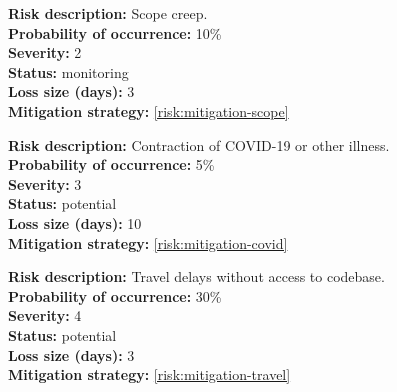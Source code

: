 \par

\hrulefill

\textbf{Risk description:} Scope creep.\\
\vspace{-2mm}
\textbf{Probability of occurrence:} 10\%\\
\vspace{-2mm}
\textbf{Severity:} 2\\
\vspace{-2mm}
\textbf{Status:} monitoring\\
\vspace{-2mm}
\textbf{Loss size (days):} 3\\
\textbf{Mitigation strategy:} \cref{risk:mitigation-scope}\\

\par

\pagebreak


\textbf{Risk description:} Contraction of COVID-19 or other illness.\\
\vspace{-2mm}
\textbf{Probability of occurrence:} 5\%\\
\vspace{-2mm}
\textbf{Severity:} 3\\
\vspace{-2mm}
\textbf{Status:} potential\\
\vspace{-2mm}
\textbf{Loss size (days):} 10\\
\vspace{-1mm}
\textbf{Mitigation strategy:} \cref{risk:mitigation-covid}\\


\hrulefill

\textbf{Risk description:} Travel delays without access to codebase.\\
\vspace{-2mm}
\textbf{Probability of occurrence:} 30\%\\
\vspace{-2mm}
\textbf{Severity:} 4\\
\vspace{-2mm}
\textbf{Status:} potential\\
\vspace{-2mm}
\textbf{Loss size (days):} 3\\
\textbf{Mitigation strategy:} \cref{risk:mitigation-travel}\\
\par

